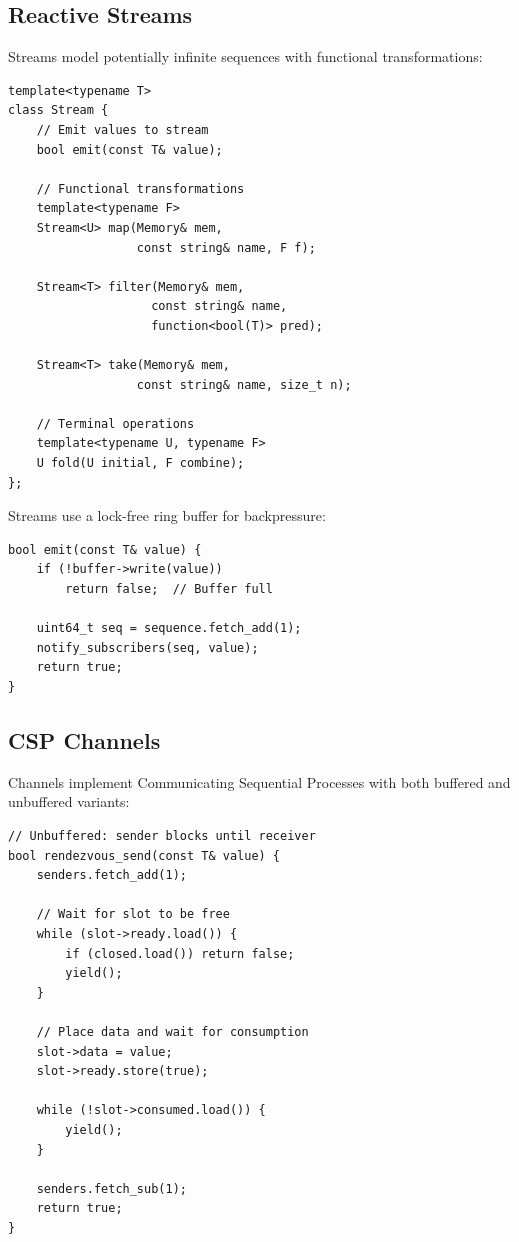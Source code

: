 \documentclass[10pt,conference]{IEEEtran}
\begin{document}
\subsection{Reactive Streams}

Streams model potentially infinite sequences with functional transformations:

\begin{lstlisting}[caption={Stream Operations},label={lst:stream}]
template<typename T>
class Stream {
    // Emit values to stream
    bool emit(const T& value);
    
    // Functional transformations
    template<typename F>
    Stream<U> map(Memory& mem, 
                  const string& name, F f);
    
    Stream<T> filter(Memory& mem,
                    const string& name,
                    function<bool(T)> pred);
    
    Stream<T> take(Memory& mem, 
                  const string& name, size_t n);
    
    // Terminal operations
    template<typename U, typename F>
    U fold(U initial, F combine);
};
\end{lstlisting}

Streams use a lock-free ring buffer for backpressure:

\begin{lstlisting}[caption={Stream Ring Buffer},label={lst:streamring}]
bool emit(const T& value) {
    if (!buffer->write(value))
        return false;  // Buffer full
    
    uint64_t seq = sequence.fetch_add(1);
    notify_subscribers(seq, value);
    return true;
}
\end{lstlisting}

\subsection{CSP Channels}

Channels implement Communicating Sequential Processes with both buffered and unbuffered variants:

\begin{lstlisting}[caption={Channel Rendezvous},label={lst:channel}]
// Unbuffered: sender blocks until receiver
bool rendezvous_send(const T& value) {
    senders.fetch_add(1);
    
    // Wait for slot to be free
    while (slot->ready.load()) {
        if (closed.load()) return false;
        yield();
    }
    
    // Place data and wait for consumption
    slot->data = value;
    slot->ready.store(true);
    
    while (!slot->consumed.load()) {
        yield();
    }
    
    senders.fetch_sub(1);
    return true;
}
\end{lstlisting}
\end{document}
